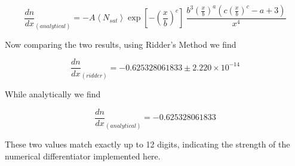 \begin{equation}
    \frac{dn}{dx}_{(analytical)} = -A\left<N_{sat}\right>\exp\left[-\left(\frac{x}{b}\right)^c\right]~\frac{b^3\left(\frac{x}{b}\right)^a\left(c\left(\frac{x}{b}\right)^c - a + 3 \right) }{x^4}
\end{equation}

Now comparing the two results, using Ridder's Method we find

\begin{equation*}
    \frac{dn}{dx}_{(ridder)} = -0.625328061833 \pm 2.220 \times 10^{-14}
\end{equation*}

While analytically we find

\begin{equation*}
    \frac{dn}{dx}_{(analytical)} = -0.625328061833
\end{equation*}

These two values match exactly up to 12 digits, indicating the strength of the numerical differentiator implemented here.


